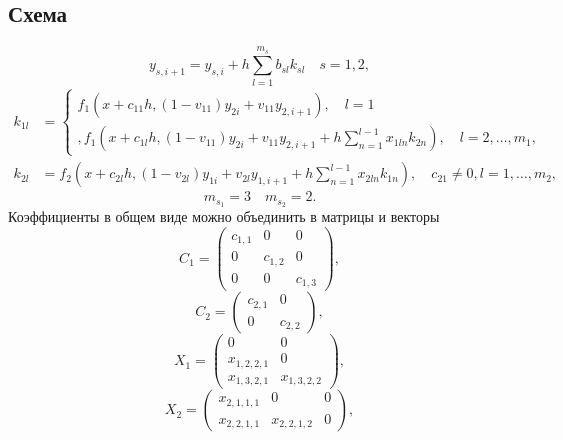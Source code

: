 \documentclass[a4paper,article,14pt]{extarticle}
\begin{document}
\subsection{Схема}
\begin{equation}
    y_{s,i+1} = y_{s,i} + h \sum_{l=1}^{m_{s}} b_{sl} k_{sl} \quad s = 1, 2,
    \label{eq:method}
\end{equation}
\begin{equation}
\begin{aligned}
    k_{1l} &= 
\begin{cases}
    f_{1}(x + c_{11} h, (1 - v_{11}) y_{2i} + v_{11} y_{2,i+1}), \quad l = 1 \\,
    f_{1}(x + c_{1l} h, (1 - v_{11}) y_{2i} + v_{11} y_{2,i+1} + h \sum_{n=1}^{l-1} x_{1ln} k_{2n}), \quad l = 2, \dotsc, m_{1},
\end{cases}
    \\k_{2l} &= 
    f_{2}(x + c_{2l} h, (1 - v_{2l}) y_{1i} + v_{2l} y_{1,i+1} + h \sum_{n=1}^{l-1} x_{2ln} k_{1n}), \quad c_{21} \not= 0, l = 1, \dotsc, m_{2},
\end{aligned}
\label{eq:method_k}
\end{equation}
\begin{equation}
    m_{s_{1}} = 3 \quad m_{s_{2}} = 2.
\end{equation}
Коэффициенты в общем виде можно объединить в матрицы и векторы
\begin{equation}
C_{1} =
\begin{pmatrix}
    c_{1,1} & 0 & 0 \\
    0 & c_{1,2} & 0 \\
    0 & 0 & c_{1,3}
\end{pmatrix},
\end{equation}
\begin{equation}
C_{2} =
\begin{pmatrix}
    c_{2,1} & 0 \\
    0 & c_{2,2}
\end{pmatrix},
\end{equation}
\begin{equation}
X_{1} = 
\begin{pmatrix}
    0 & 0 \\
    x_{1,2,2,1} & 0 \\
    x_{1,3,2,1} & x_{1,3,2,2}
\end{pmatrix},
\end{equation}
\begin{equation}
X_{2} = 
\begin{pmatrix}
    x_{2,1,1,1} & 0 & 0\\
    x_{2,2,1,1} & x_{2,2,1,2} & 0 
\end{pmatrix},
\end{equation}
\end{document}
